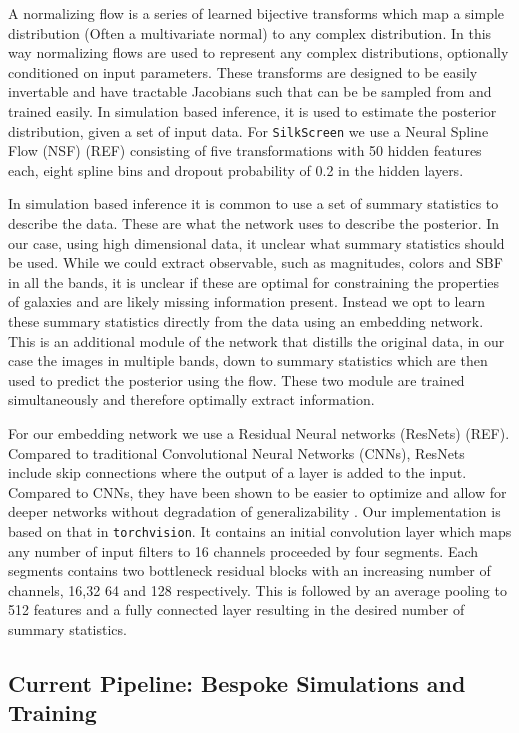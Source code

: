 \documentclass[twocolumn]{aastex631}
\newcommand{\code}[0]{\texttt{SilkScreen}}
\begin{document}
A normalizing flow is a series of learned bijective transforms which map a simple distribution (Often a multivariate normal) to any complex distribution. In this way normalizing flows are used to represent any complex distributions, optionally conditioned on input parameters. These transforms are designed to be easily invertable and have tractable Jacobians such that can be be sampled from and trained easily. In simulation based inference, it is used to estimate the posterior distribution, given a set of input data. For \code{} we use a Neural Spline Flow (NSF) (REF) consisting of five transformations with 50 hidden features each, eight spline bins and dropout probability of 0.2 in the hidden layers.

In simulation based inference it is common to use a set of summary statistics to describe the data. These are what the network uses to describe the posterior. In our case, using high dimensional data, it unclear what summary statistics should be used. While we could extract observable, such as magnitudes, colors and SBF in all the bands, it is unclear if these are optimal for constraining the properties  of galaxies and are likely missing information present. Instead we opt to learn these summary statistics directly from the data using an embedding network. This is an additional module of the network that distills the original data, in our case the images in multiple bands, down to summary statistics which are then used to predict the posterior using the flow. These two module are trained simultaneously and therefore optimally extract information.

For our embedding network we use a Residual Neural networks (ResNets) (REF). Compared to traditional Convolutional Neural Networks (CNNs), ResNets include skip connections where the output of  a layer is added to the input. Compared to CNNs, they have been shown to be easier to optimize and allow for deeper networks without degradation of generalizability . Our implementation is based on that in \texttt{torchvision}. It contains an initial convolution layer which maps any number of input filters to 16 channels proceeded by four segments. Each segments contains two bottleneck residual blocks with an increasing number of channels, 16,32 64 and 128 respectively. This is followed by an average pooling to 512 features and a fully connected layer resulting in the desired number of summary statistics.

\subsection{Current Pipeline: Bespoke Simulations and Training}
\label{sec:walkthrough}
\end{document}
